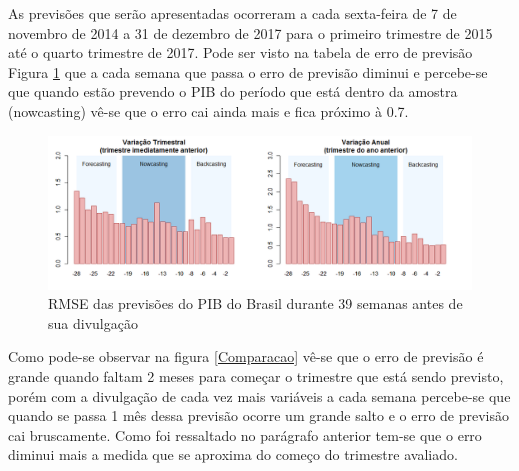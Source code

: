 \documentclass{article}
\begin{document}
As previsões que serão apresentadas ocorreram a cada sexta-feira de 7 de novembro de 2014 a 31 de dezembro de 2017  para o primeiro trimestre de 2015 até o quarto trimestre de 2017. Pode ser visto na tabela de erro de previsão Figura \ref{rmse39} que a cada semana que passa o erro de previsão diminui e percebe-se que quando estão prevendo o PIB do período que está dentro da amostra (nowcasting) vê-se que o erro cai ainda mais e fica próximo à 0.7.

\begin{figure}[H]
  \centering
  \includegraphics[width=1\textwidth]{rmse_nowcasting} %
  \caption{RMSE das previsões do PIB do Brasil durante 39 semanas antes de sua divulgação}
  \label{rmse39}
\end{figure}

Como pode-se observar na figura \ref{Comparacao} vê-se que o erro de previsão é grande quando faltam 2 meses para começar o trimestre que está sendo previsto, porém com a divulgação de cada vez mais variáveis a cada semana percebe-se que quando se passa 1 mês dessa previsão ocorre um grande salto e o erro de previsão cai bruscamente. Como foi ressaltado no parágrafo anterior tem-se que o erro diminui mais a medida que se aproxima do começo do trimestre avaliado. 
\end{document}
